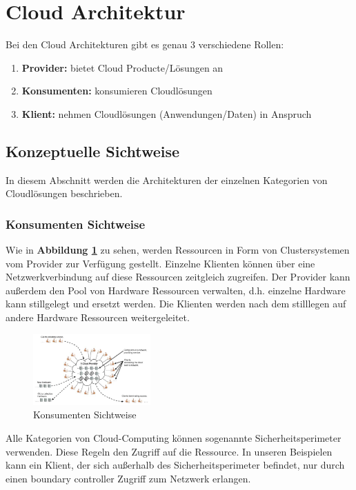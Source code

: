 \section{Cloud Architektur}

Bei den Cloud Architekturen gibt es genau 3 verschiedene Rollen:
\begin{enumerate}
	\item \textbf{Provider:} bietet Cloud Producte/Lösungen an
	\item \textbf{Konsumenten:} konsumieren Cloudlösungen
	\item \textbf{Klient:} nehmen Cloudlösungen
	 (Anwendungen/Daten) in Anspruch
\end{enumerate}

\subsection{Konzeptuelle Sichtweise}

In diesem Abschnitt werden die Architekturen der einzelnen Kategorien von Cloudlösungen beschrieben.

\subsubsection{Konsumenten Sichtweise}

Wie in \textbf{Abbildung \ref{ConsumerView}} zu sehen, werden Ressourcen in Form von Clustersystemen vom Provider zur Verfügung gestellt.
Einzelne Klienten können über eine Netzwerkverbindung auf diese Ressourcen zeitgleich zugreifen. Der Provider kann außerdem den Pool
von Hardware Ressourcen verwalten, d.h. einzelne Hardware kann stillgelegt und ersetzt werden. Die Klienten werden nach dem stilllegen
auf andere Hardware Ressourcen weitergeleitet.
\begin{figure}[H]
    \centering
	\includegraphics[width=0.4\textwidth]{Images/ConsumerView}
	\caption{Konsumenten Sichtweise \cite{Badger}}
	\label{ConsumerView}
\end{figure}


Alle Kategorien von Cloud-Computing können sogenannte Sicherheitsperimeter verwenden. Diese Regeln den Zugriff auf die Ressource.
In unseren Beispielen kann ein Klient, der sich außerhalb des Sicherheitsperimeter befindet, nur durch einen \glqq boundary controller\grqq
Zugriff zum Netzwerk erlangen.

